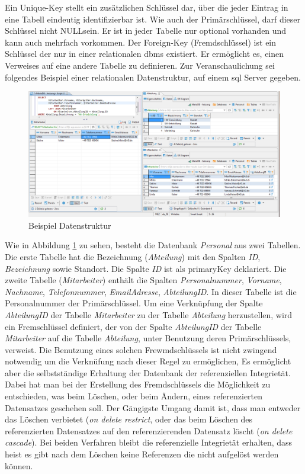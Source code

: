 Ein Unique-Key stellt ein zusätzlichen Schlüssel dar, über die jeder Eintrag in eine Tabell eindeutig identifizierbar ist.
Wie auch der Primärschlüssel, darf dieser Schlüssel nicht \glqq NULL\grqq{}sein.
Er ist in jeder Tabelle nur optional vorhanden und kann auch mehrfach vorkommen.
Der Foreign-Key (Fremdschlüssel) ist ein Schlüssel der nur in einer relationalen \ac{dbms} existiert.
Er ermöglicht es, einen Verweises auf eine andere Tabelle zu definieren.
Zur Veranschaulichung sei folgendes Beispiel einer relationalen Datenstruktur,
auf einem \ac{sql} Server gegeben.
\begin{figure}[hbt]
  \centering
  \includegraphics[width=\textwidth]{content/hauptteil/theoretischeGrundlagen/rec/exampleSQL.png}
\caption{Beispiel Datenstruktur}
 \label{fig:exampleSQLStructure}%
\end{figure}
Wie in Abbildung \ref{fig:exampleSQLStructure} zu sehen, besteht die Datenbank \emph{Personal} aus zwei Tabellen.
Die erste Tabelle hat die Bezeichnung (\emph{Abteilung}) mit den Spalten \emph{ID}, \emph{Bezeichnung} sowie Standort.
Die Spalte \emph{ID} ist als primaryKey deklariert.
Die zweite Tabelle (\emph{Mitarbeiter}) enthält die Spalten 
\emph{Personalnummer}, \emph{Vorname}, \emph{Nachname}, \emph{Telefonnummer}, \emph{EmailAdresse}, \emph{AbteilungID}.
In dieser Tabelle ist die Personalnummer der Primärschlüssel.
Um eine Verknüpfung der Spalte \emph{AbteilungID} der Tabelle \emph{Mitarbeiter} zu der Tabelle \emph{Abteilung} herzustellen, 
wird ein Fremschlüssel definiert, der von der Spalte \emph{AbteilungID} der Tabelle \emph{Mitarbeiter} auf die Tabelle \emph{Abteilung}, 
unter Benutzung deren Primärschlüssels, verweist.
Die Benutzung eines solchen Frewmdschlüssels ist nicht zwingend notwendig um die Verknüfung nach dieser Regel zu ermöglichen,
Es ermöglicht aber die selbstständige Erhaltung der Datenbank der referenziellen Integrietät. 
Dabei hat man bei der Erstellung des Fremdschlüssels die Möglichkeit zu entschieden, was beim Löschen, oder beim Ändern, eines referenzierten Datensatzes geschehen soll.
Der Gängigste Umgang damit ist, dass man entweder das Löschen verbietet (\emph{on delete restrict},
oder das beim Löschen des referenzierten Datensatzes auf den referenzierenden Datensatz löscht (\emph{on delete cascade}).
Bei beiden Verfahren bleibt die referenzielle Integrietät erhalten, 
dass heist es gibt nach dem Löschen keine Referenzen die nicht aufgelöst werden können.


